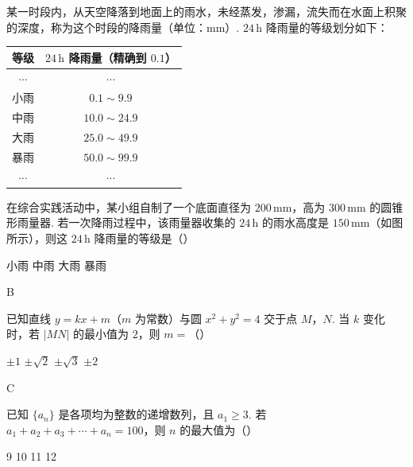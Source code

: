 \begin{problem}
某一时段内，从天空降落到地面上的雨水，未经蒸发，渗漏，流失而在水面上积聚的深度，称为这个时段的降雨量（单位：\(\mathrm{mm}\)）. \(24\,\mathrm{h}\) 降雨量的等级划分如下：

\begin{center}
\begin{tabular}{c|c}
等级 & \(24\,\mathrm{h}\) 降雨量（精确到 \(0.1\)） \\
\hline
\(\cdots\) & \(\cdots\) \\
小雨 & \(0.1\sim9.9\) \\
中雨 & \(10.0\sim24.9\) \\
大雨 & \(25.0\sim49.9\) \\
暴雨 & \(50.0\sim99.9\) \\
\(\cdots\) & \(\cdots\)
\end{tabular}
\end{center}

在综合实践活动中，某小组自制了一个底面直径为 \(200\,\mathrm{mm}\)，高为 \(300\,\mathrm{mm}\) 的圆锥形雨量器. 若一次降雨过程中，该雨量器收集的 \(24\,\mathrm{h}\) 的雨水高度是 \(150\,\mathrm{mm}\)（如图所示），则这 \(24\,\mathrm{h}\) 降雨量的等级是（\quad）


\choices
    {小雨}
    {中雨}
    {大雨}
    {暴雨}
\end{problem}

\begin{answer}
B
\end{answer}

\begin{problem}
已知直线 \(y=kx+m\)（\(m\) 为常数）与圆 \(x^2+y^2=4\) 交于点 \(M\)，\(N\). 当 \(k\) 变化时，若 \(|MN|\) 的最小值为 \(2\)，则 \(m=\)（\quad）

\choices
    {\(\pm1\)}
    {\(\pm\sqrt2\)}
    {\(\pm\sqrt3\)}
    {\(\pm2\)}
\end{problem}

\begin{answer}
C
\end{answer}

\begin{problem}
已知 \(\{a_n\}\) 是各项均为整数的递增数列，且 \(a_1\ge3\). 若 \(a_1+a_2+a_3+\cdots+a_n=100\)，则 \(n\) 的最大值为（\quad）

\choices
    {9}
    {10}
    {11}
    {12}
\end{problem}

